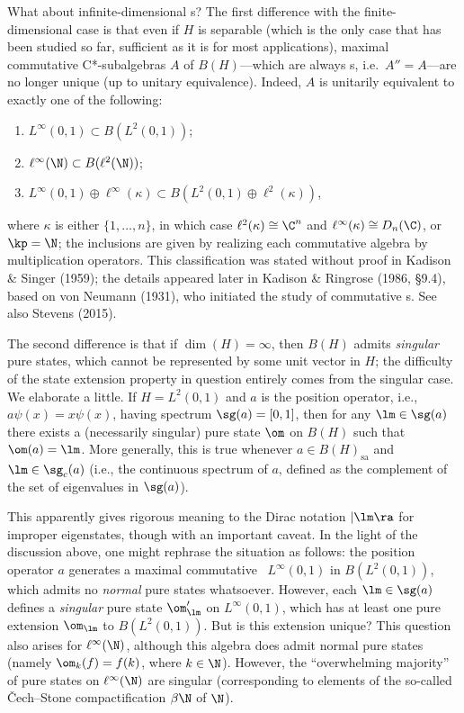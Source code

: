 \documentclass[12pt]{article}
\begin{document}
 What about infinite-dimensional \Hs s? The first difference with the finite-dimensional case is that even if $H$ is separable (which is the only case that has been studied so far, sufficient as it is for most applications), maximal commutative C*-subalgebras $A$ of $B(H)$---which are always \vna s, i.e.\ $A''=A$---are no longer unique (up to unitary equivalence). Indeed,  $A$
is unitarily equivalent to exactly one of the following:
\begin{enumerate}
\item $L^{\infty}(0,1)\subset B(L^2(0,1))$;
\item $\ell^{\infty}(\N)\subset B(\ell^2(\N))$;
\item $L^{\infty}(0,1)\oplus \ell^{\infty}(\kappa)\subset B(L^2(0,1)\oplus\ell^2(\kappa))$,
\end{enumerate}
where $\kappa$ is either $\{1,\ldots, n\}$, 
in which case $\ell^2(\kappa)\cong\C^n$ and $\ell^{\infty}(\kappa)\cong D_n(\C)$, or $\kp=\N$;
the inclusions are given by realizing each commutative algebra by multiplication operators. This classification was stated without proof in Kadison \& Singer (1959); the details appeared later in  Kadison \& Ringrose (1986, \S9.4), based on von Neumann (1931), who initiated the study of commutative \vna s. See also Stevens (2015). 

 The second difference  is that if $\dim(H)=\infty$, then $B(H)$ admits \emph{singular} pure states, which cannot be represented by some unit vector in $H$; the difficulty of the state extension property in question entirely comes from the singular case. 
We elaborate a little. If $H=L^2(0,1)$ and $a$ is the position operator, i.e., $a\psi(x)=x\psi(x)$, having spectrum $\sg(a)=[0,1]$, then for any $\lm\in\sg(a)$ there exists a (necessarily singular) pure state $\om$ on $B(H)$ such that $\om(a)=\lm$. More generally, this is true whenever $a\in B(H)_{\mathrm{sa}}$ and $\lm\in\sg_c(a)$ (i.e., the continuous spectrum of $a$, defined as the complement of the set of eigenvalues in $\sg(a)$). 

This apparently gives rigorous meaning to the Dirac notation $|\lm\ra$ for improper eigenstates, though with an important caveat. In the light of the discussion above, one might rephrase the  situation as follows: the position operator $a$ generates a maximal commutative \ca\ $L^{\infty}(0,1)$ in $B(L^2(0,1))$, which admits no \emph{normal} pure states whatsoever. However, each $\lm\in\sg(a)$ defines a \emph{singular} pure state  $\om'_{\lm}$ on $L^{\infty}(0,1)$, which has at least one pure extension $\om_{\lm}$ to $B(L^2(0,1))$. But is this extension unique? This question also arises for 
$\ell^{\infty}(\N)$, although this algebra does admit normal pure states (namely $\om_k(f)=f(k)$, where $k\in\N$). However, the ``overwhelming majority'' of pure states on $\ell^{\infty}(\N)$ are singular (corresponding to elements of the so-called  \v{C}ech--Stone compactification $\beta\N$ of $\N$). 
\end{document}
